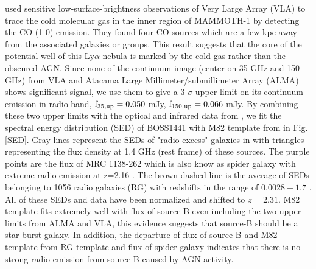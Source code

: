\cite{emonts2019cold} used sensitive low-surface-brightness observations of Very Large Array (VLA) to trace the cold molecular gas in the inner region of MAMMOTH-1 by detecting the CO (1-0) emission. They found four CO sources which are a few kpc away from the associated galaxies or groups. This result suggests that the core of the potential well of this Ly$\alpha$ nebula is marked by the cold gas rather than the obscured AGN. Since none of the continuum image (center on 35 GHz and 150 GHz) from VLA and Atacama Large Millimeter/submillimeter Array (ALMA) shows significant signal, we use them to give a 3-$\sigma$ upper limit on its continuum emission in radio band, $\rm f_{35,up}=0.050$ mJy, $\rm f_{150,up}=0.066$ mJy. By combining these two upper limits with the optical and infrared data from \citet{arrigoni2018overdensity}, we fit the spectral energy distribution (SED) of BOSS1441 with M82 template from \cite{Silva_1998} in Fig.\ref{SED}. Gray lines represent the SEDs of "radio-excess" galaxies in \citet{harrison2014kiloparsec} with triangles representing the flux density at 1.4 GHz (rest frame) of these sources. The purple points are the flux of MRC 1138-262 which is also know as spider galaxy with extreme radio emission at z=2.16 \citep{Nesvadba_2006}. The brown dashed line is the average of SEDs belonging to 1056 radio galaxies (RG) with redshifts in the range of $0.0028-1.7$ \citep{Toba_2019}. All of these SEDs and data have been normalized and shifted to $z=2.31$. M82 template fits extremely well with flux of source-B even including the two upper limits from ALMA and VLA, this evidence suggests that source-B should be a star burst galaxy. In addition, the departure of flux of source-B and M82 template from RG template and flux of spider galaxy indicates that there is no strong radio emission from source-B caused by AGN activity.
	
